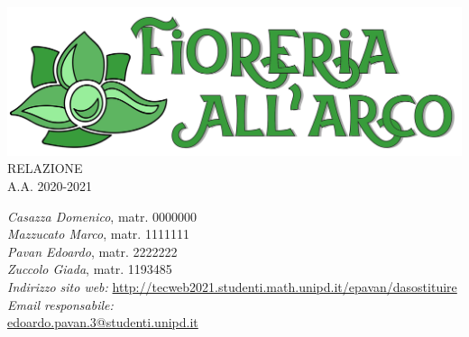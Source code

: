 \thispagestyle{empty}
\begin{titlepage}
	\begin{center}
		


		\includegraphics[scale = 0.07]{../latex/images/logotitle.png}\\[2.5cm]

			\Huge \textsc{RELAZIONE \doctitle{}}\\ [1cm]                          
			\Large \textsf{A.A. 2020-2021} 
		

        
        \vfill
\Large \textsl{Casazza Domenico}, \textsf{matr. 0000000} \\ [0.1cm]
\Large \textsl{Mazzucato Marco}, \textsf{matr. 1111111} \\ [0.1cm]
\Large \textsl{Pavan Edoardo}, \textsf{matr. 2222222} \\ [0.1cm]
\Large \textsl{Zuccolo Giada}, \textsf{matr. 1193485} \\ [2cm]
                
\Large \textsl{Indirizzo sito web:}  \textsf{\href{http://tecweb2021.studenti.math.unipd.it/epavan/dasostituire}{http://tecweb2021.studenti.math.unipd.it/epavan/dasostituire}}\\[0.25cm]
\Large \textsl{Email responsabile:}\\ 
\textsf{\href{edoardo.pavan.3@studenti.unipd.it}{edoardo.pavan.3@studenti.unipd.it}}


	\end{center}
\end{titlepage}